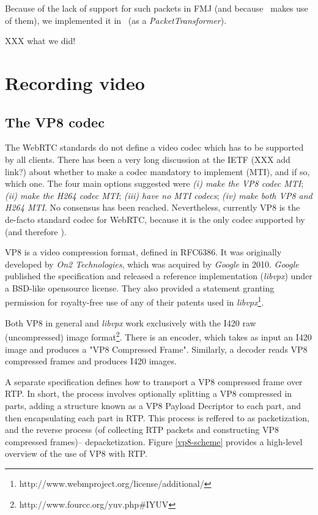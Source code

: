 \documentclass[twoside,openright,a4paper,12pt,english]{article}
\begin{document}
Because of the lack of support for such packets in FMJ (and because \wrtc\
makes use of them), we implemented it in \lj\ (as a \emph{PacketTransformer}).

XXX what we did!
\section{Recording video}
\label{recording-video}
\subsection{The VP8 codec}
The WebRTC standards do not define a video codec which has to be supported by all clients. There
has been a very long discussion at the IETF
(XXX add link?)
about whether to make a codec mandatory to implement (MTI), and if so, which one. The
four main options suggested were
\emph{(i) make the VP8 codec MTI};
\emph{(ii) make the H264 codec MTI};
\emph{(iii) have no MTI codecs};
\emph{(iv) make both VP8 and H264 MTI}. No consensus has been reached.
Nevertheless, currently VP8 is the de-facto standard codec for WebRTC, because
it is the only codec supported by \wrtc (and therefore \jm).


VP8 is a video compression format, defined in RFC6386\cite{vp8}. It was
originally developed by \emph{On2 Technologies}, which was acquired by
\emph{Google} in 2010. \emph{Google} published the specification and released a
reference implementation (\emph{libvpx}) under a BSD-like opensource
license. They also provided a statement granting permission for royalty-free
use of any of their patents used in
\emph{libvpx}\footnote{http://www.webmproject.org/license/additional/}.


Both VP8 in general and \emph{libvpx} work exclusively with the I420 raw
(uncompressed) image format\footnote{http://www.fourcc.org/yuv.php\#IYUV}.
There is an encoder, which takes as input an I420 image and produces a "VP8
Compressed Frame". Similarly, a decoder reads VP8 compressed frames and
produces I420 images.

A separate specification\cite{vp8rtp} defines how to transport a VP8 compressed
frame over RTP. In short, the process involves optionally splitting a VP8
compressed in parts, adding a structure known as a VP8 Payload Decriptor to
each part, and then encapsulating each part in RTP. This process is reffered to
as packetization, and the reverse process (of collecting RTP packets and
constructing VP8 compressed frames)-- depacketization. Figure \ref{vp8-scheme}
provides a high-level overview of the use of VP8 with RTP.
\end{document}
